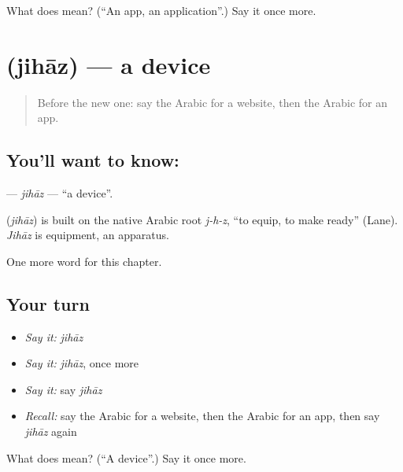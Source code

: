 \begin{tcolorbox}[breakable,colback=teal!4,colframe=teal!35!black,title={Before you move on}]
What does  mean? (\textquotedblleft{}An app, an application\textquotedblright{}.) Say it once more.
\end{tcolorbox}
\section[\texorpdfstring{\ar{جهاز} (jihāz)}{جهاز (jihāz)}]{ (jihāz) — a device}

\label{lesson:AR-C248-jihaz}



\begin{quote}
Before the new one: say the Arabic for a website, then the Arabic for an app.
\end{quote}

\subsection*{You'll want to know: }
\textbf{} — \emph{jihāz} — \textquotedblleft{}a device\textquotedblright{}.

\begin{cousinweb}
\textbf{} (\emph{jihāz}) is built on the native Arabic root \emph{j-h-z}, \textquotedblleft{}to equip, to make ready\textquotedblright{} (Lane). \emph{Jihāz} is equipment, an apparatus.
\end{cousinweb}

\begin{grammarlens}[title={What you've built}]
One more word for this chapter.
\end{grammarlens}

\subsection*{Your turn}
\begin{itemize}
\raggedright
  \item \emph{Say it:} \emph{jihāz}
  \item \emph{Say it:} \emph{jihāz}, once more
  \item \emph{Say it:} say \emph{jihāz}
  \item \emph{Recall:} say the Arabic for a website, then the Arabic for an app, then say \emph{jihāz} again
\end{itemize}

\begin{tcolorbox}[breakable,colback=teal!4,colframe=teal!35!black,title={Before you move on}]
What does  mean? (\textquotedblleft{}A device\textquotedblright{}.) Say it once more.
\end{tcolorbox}
